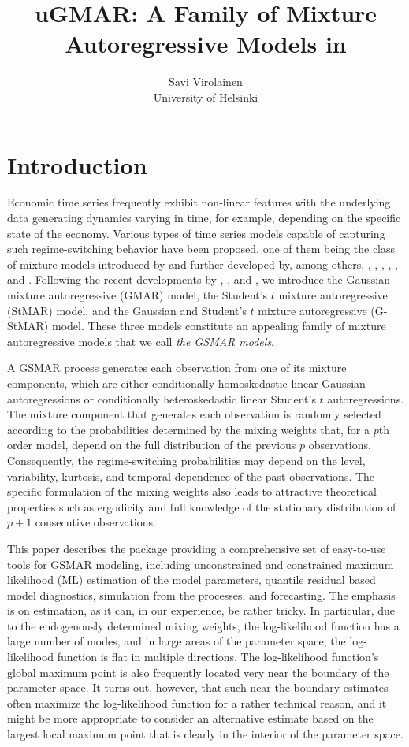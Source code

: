 \documentclass[nojss]{jss} %
\author{Savi Virolainen\\ University of Helsinki}
\title{uGMAR: A Family of Mixture Autoregressive Models in \proglang{R}}
\begin{document}
\section{Introduction}
Economic time series frequently exhibit non-linear features with the underlying data generating dynamics varying in time, for example, depending on the specific state of the economy. Various types of time series models capable of capturing such regime-switching behavior have been proposed, one of them being the class of mixture models introduced by \cite{Le+Martin+Raftery:1996} and further developed by, among others, \cite{Wong+Li:2000, Wong+Li:2001, Wong+Li2:2001}, \cite{Glasbey:2001}, \cite{Lanne+Saikkonen:2003}, \cite{Kalliovirta+Meitz+Saikkonen:2015}, \cite{Meitz+Preve+Saikkonen:2021}, and \cite{Virolainen:2020}. Following the recent developments by \cite{Kalliovirta+Meitz+Saikkonen:2015}, \cite{Meitz+Preve+Saikkonen:2021}, and \cite{Virolainen:2020}, we introduce the Gaussian mixture autoregressive (GMAR) model, the Student's $t$ mixture autoregressive (StMAR) model, and the Gaussian and Student's $t$ mixture autoregressive (G-StMAR) model. These three models constitute an appealing family of mixture autoregressive models that we call \textit{the GSMAR models}.

A GSMAR process generates each observation from one of its mixture components, which are either conditionally homoskedastic linear Gaussian autoregressions or conditionally heteroskedastic linear Student's $t$ autoregressions. The mixture component that generates each observation is randomly selected according to the probabilities determined by the mixing weights that, for a $p$th order model, depend on the full distribution of the previous $p$ observations. Consequently, the regime-switching probabilities may depend on the level, variability, kurtosis, and temporal dependence of the past observations. The specific formulation of the mixing weights also leads to attractive theoretical properties such as ergodicity and full knowledge of the stationary distribution of $p+1$ consecutive observations.

This paper describes the  package  providing a comprehensive set of easy-to-use tools for GSMAR modeling, including unconstrained and constrained maximum likelihood (ML) estimation of the model parameters, quantile residual based model diagnostics, simulation from the processes, and forecasting. The emphasis is on estimation, as it can, in our experience, be rather tricky. In particular, due to the endogenously determined mixing weights, the log-likelihood function has a large number of modes, and in large areas of the parameter space, the log-likelihood function is flat in multiple directions. The log-likelihood function's global maximum point is also frequently located very near the boundary of the parameter space. It turns out, however, that such near-the-boundary estimates often maximize the log-likelihood function for a rather technical reason, and it might be more appropriate to consider an alternative estimate based on the largest local maximum point that is clearly in the interior of the parameter space.
\end{document}
